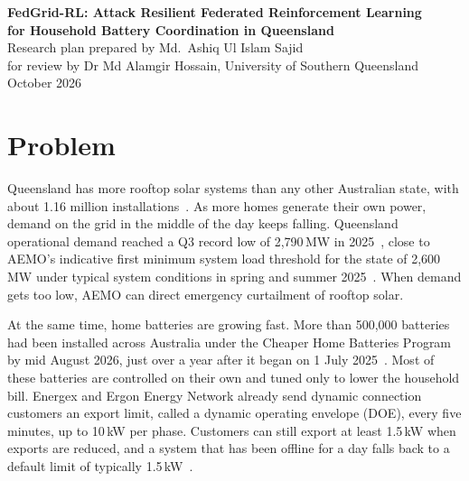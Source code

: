 \documentclass[11pt,a4paper]{article}
\begin{document}
\begin{center}
{\Large\bfseries FedGrid-RL: Attack Resilient Federated Reinforcement Learning\\[2pt]
for Household Battery Coordination in Queensland}\\[10pt]
{\normalsize Research plan prepared by Md.\ Ashiq Ul Islam Sajid\\
for review by Dr Md Alamgir Hossain, University of Southern Queensland}\\[4pt]
{\small October 2026}
\end{center}

\vspace{4pt}
\noindent{}

\section{Problem}

Queensland has more rooftop solar systems than any other Australian state, with about 1.16 million installations~\cite{cec2025}. As more homes generate their own power, demand on the grid in the middle of the day keeps falling. Queensland operational demand reached a Q3 record low of 2,790\,MW in 2025~\cite{aemo_q3}, close to AEMO's indicative first minimum system load threshold for the state of 2,600\,MW under typical system conditions in spring and summer 2025~\cite{aemo_msl}. When demand gets too low, AEMO can direct emergency curtailment of rooftop solar.

At the same time, home batteries are growing fast. More than 500,000 batteries had been installed across Australia under the Cheaper Home Batteries Program by mid August 2026, just over a year after it began on 1 July 2025~\cite{pm_batteries}. Most of these batteries are controlled on their own and tuned only to lower the household bill. Energex and Ergon Energy Network already send dynamic connection customers an export limit, called a dynamic operating envelope (DOE), every five minutes, up to 10\,kW per phase. Customers can still export at least 1.5\,kW when exports are reduced, and a system that has been offline for a day falls back to a default limit of typically 1.5\,kW~\cite{energex_doe,ergon_doe}.
\end{document}
